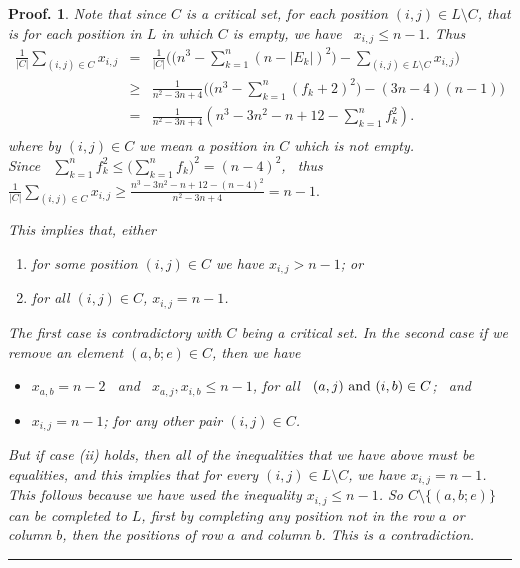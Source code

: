 \documentclass[12pt]{article}
\newtheorem{preproof}{{\bf Proof.}}
\newenvironment{proof}[1]{\begin{preproof}{\rm
               #1}\hfill{\rule[-0.5mm]{2mm}{2mm}}}{\end{preproof}}
\begin{document}
\begin{proof}
{Note that since $C$ is a critical set, for each  position
$(i,j) \in L\setminus C$, that is for each position in $L$ in which $C$ is
empty, we have \ $x_{i,j} \leq n-1$. Thus
%
\begin{displaymath}
\begin{array}{ccl}
\frac{1}{|C|}{\displaystyle{\sum_{(i,j)\in C} x_{i,j}}} & = &
\frac{1}{|C|}\Big( (n^3 -{\displaystyle{ \sum_{k=1}^{n}(n-|E_k|)^2)}} -
{\displaystyle{\sum_{(i,j)\in L\setminus C} x_{i,j}}} \Big)    \\
%
&\ge &
\frac{1}{n^2-3n+4}\Big( (n^3 -{\displaystyle{ \sum_{k=1}^{n}(f_k+2)^2)}} -
(3n-4)(n-1) \Big)  \\
%
& = &
\frac{1}{n^2-3n+4}{\displaystyle(n^3 - 3n^2-n +12 -{\sum_{k=1}^{n}f^2_k})}. \\
%
\end{array}
\end{displaymath}
where by $(i,j) \in  C$ we mean a position in $C$  which  is not empty. \\
Since \
${\displaystyle{\sum_{k=1}^{n}f^2_k}} \le
{\displaystyle{(\sum_{k=1}^{n}f_k})^2} = (n-4)^2$, \ thus \
%
$\frac{1}{|C|}{\displaystyle{\sum_{(i,j)\in C} x_{i,j}}} \ge
\frac{n^3 - 3n^2-n +12 -(n-4)^2}{n^2-3n+4} = n-1.$

\noindent
This implies that, either
\begin{enumerate}
\item[(i)]
for some position $(i,j)\in C$ we have $x_{i,j} > n-1$; or
\item[(ii)]
for all $(i,j)\in C$,  $x_{i,j} = n-1$.
\end{enumerate}
The first case is contradictory with $C$ being a critical set.
In the second case if we remove an element $(a,b;e) \in C$, then we have
\begin{itemize}
\item
 $x_{a,b} = n-2$ \ and \
 $x_{a,j} , x_{i,b} \le n-1$, for all \ $(a,j) \ {\rm and} \ (i,b) \in C$; \
 and
 \item
  $x_{i,j} = n-1$; for any other pair $(i,j) \in C$.
\end{itemize}

But if case (ii)
holds, then all of the inequalities that we have above
must be equalities, and
this implies that for every $(i,j) \in L\setminus C$, we have $x_{i,j} = n - 1$.
This follows because we have used the inequality  $x_{i,j}\le  n-1$.
So  $C\setminus\{(a,b;e)\}$ can be completed to $L$, first by completing any
position not in the row $a$ or column $b$, then the positions of row $a$
and column $b$. This is a contradiction.
%
}\end{proof}
%
\end{document}
